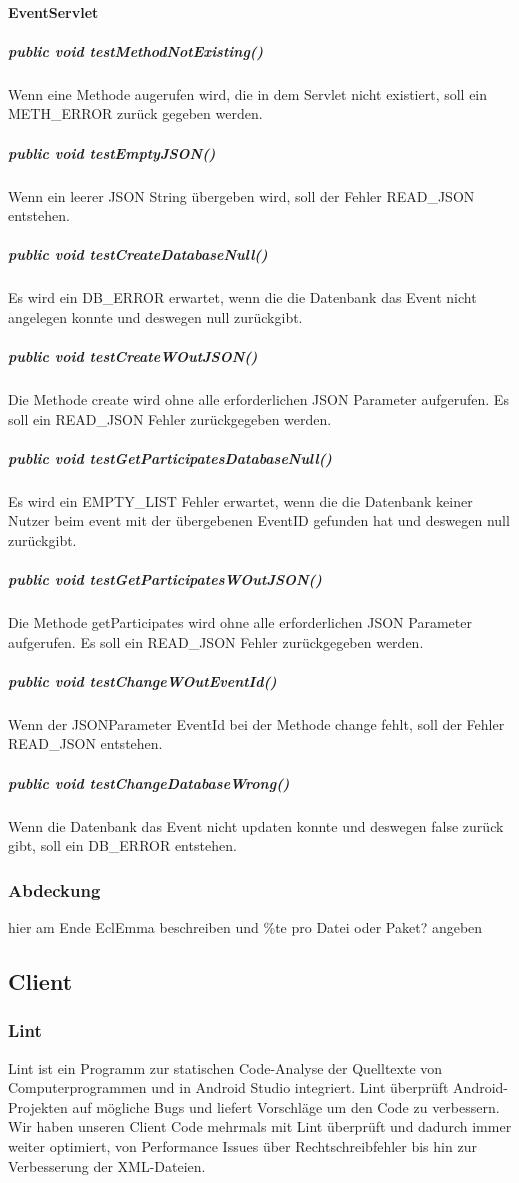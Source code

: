 \documentclass{scrartcl}
\begin{document}
\paragraph{EventServlet}
\subparagraph{public void testMethodNotExisting()}
Wenn eine Methode augerufen wird, die in dem Servlet nicht existiert, soll ein METH\_ERROR zurück gegeben werden.
\subparagraph{public void testEmptyJSON()}
Wenn ein leerer JSON String übergeben wird, soll der Fehler READ\_JSON entstehen.
\subparagraph{public void testCreateDatabaseNull()}
Es wird ein DB\_ERROR erwartet, wenn die die Datenbank das Event nicht angelegen konnte und deswegen null zurückgibt.
\subparagraph{public void testCreateWOutJSON()}
Die Methode create wird ohne alle erforderlichen JSON Parameter aufgerufen. Es soll ein READ\_JSON Fehler zurückgegeben werden.
\subparagraph{public void testGetParticipatesDatabaseNull()}
Es wird ein EMPTY\_LIST Fehler erwartet, wenn die die Datenbank keiner Nutzer beim event mit der übergebenen EventID gefunden hat und deswegen null zurückgibt.
\subparagraph{public void testGetParticipatesWOutJSON()}
Die Methode getParticipates wird ohne alle erforderlichen JSON Parameter aufgerufen. Es soll ein READ\_JSON Fehler zurückgegeben werden.
\subparagraph{public void testChangeWOutEventId()}
Wenn der JSONParameter EventId bei der Methode change fehlt, soll der Fehler READ\_JSON entstehen.
\subparagraph{public void testChangeDatabaseWrong()}
 Wenn die Datenbank das Event nicht updaten konnte und deswegen false zurück gibt, soll ein DB\_ERROR entstehen.
 
\subsubsection{Abdeckung}
hier am Ende EclEmma beschreiben und \%te pro Datei oder Paket? angeben
\newpage
\subsection{Client}
	\subsubsection{Lint}
	Lint ist ein Programm zur statischen Code-Analyse der Quelltexte von Computerprogrammen und in Android Studio integriert. Lint überprüft Android-Projekten auf mögliche Bugs und liefert Vorschläge um den Code zu verbessern.
Wir haben unseren Client Code mehrmals mit Lint überprüft und dadurch immer weiter optimiert, von Performance Issues über Rechtschreibfehler bis hin zur Verbesserung der XML-Dateien.  
\end{document}
